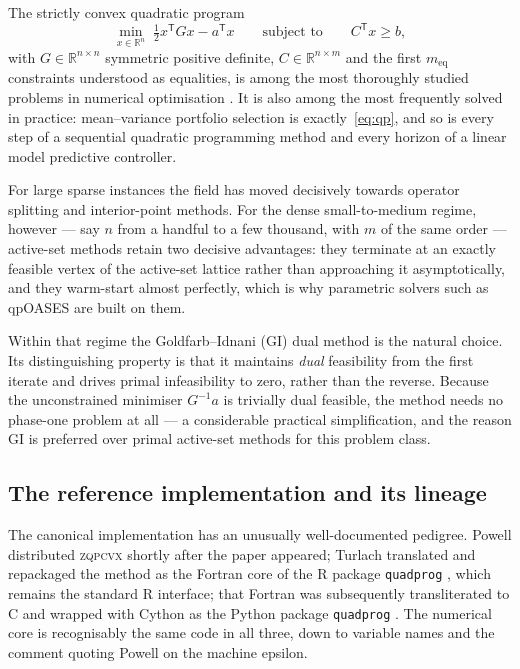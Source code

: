 \documentclass[11pt,a4paper]{article}
\theoremstyle{plain}
\theoremstyle{remark}
\newcommand{\R}{\mathbb{R}}
\newcommand{\T}{^{\mathsf{T}}}
\begin{document}
The strictly convex quadratic program
\begin{equation}
  \min_{x \in \R^n} \; \tfrac12 x\T G x - a\T x
  \qquad \text{subject to} \qquad C\T x \ge b,
  \label{eq:qp}
\end{equation}
with $G \in \R^{n \times n}$ symmetric positive definite,
$C \in \R^{n \times m}$ and the first $m_{\mathrm{eq}}$ constraints understood as
equalities, is among the most thoroughly studied problems in numerical
optimisation \citep{nocedal2006,fletcher1987,boyd2004}. It is also among the most
frequently solved in practice: mean--variance portfolio selection
\citep{markowitz1952} is exactly~\eqref{eq:qp}, and so is every step of a
sequential quadratic programming method and every horizon of a linear model
predictive controller.

For large sparse instances the field has moved decisively towards operator
splitting \citep{stellato2020} and interior-point methods. For the dense
small-to-medium regime, however --- say $n$ from a handful to a few thousand,
with $m$ of the same order --- active-set methods retain two decisive advantages:
they terminate at an exactly feasible vertex of the active-set lattice rather
than approaching it asymptotically, and they warm-start almost perfectly, which
is why parametric solvers such as qpOASES \citep{ferreau2014} are built on them.

Within that regime the Goldfarb--Idnani (GI) dual method
\citep{goldfarb1982,goldfarb1983} is the natural choice. Its distinguishing
property is that it maintains \emph{dual} feasibility from the first iterate and
drives primal infeasibility to zero, rather than the reverse. Because the
unconstrained minimiser $G^{-1}a$ is trivially dual feasible, the method needs no
phase-one problem at all --- a considerable practical simplification, and the
reason GI is preferred over primal active-set methods for this problem class.

\subsection{The reference implementation and its lineage}

The canonical implementation has an unusually well-documented pedigree. Powell
distributed \textsc{zqpcvx} \citep{powell1983} shortly after the paper appeared;
Turlach translated and repackaged the method as the Fortran core of the R package
\texttt{quadprog} \citep{turlach2019}, which remains the standard R interface;
that Fortran was subsequently transliterated to C and wrapped with Cython
\citep{cython2011} as the Python package \texttt{quadprog}
\citep{quadprogpy}. The numerical core is recognisably the same code in all
three, down to variable names and the comment quoting Powell on the machine
epsilon.
\end{document}
